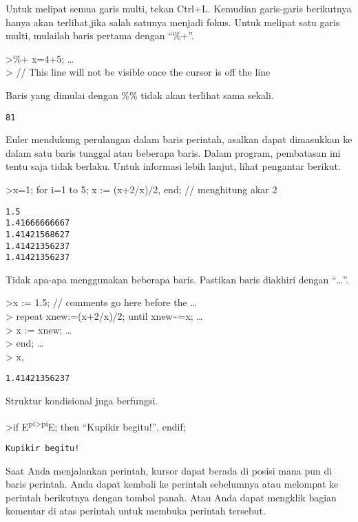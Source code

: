 \documentclass[
]{book}
\begin{document}
Untuk melipat semua garis multi, tekan Ctrl+L. Kemudian garis-garis berikutnya hanya akan terlihat,jika salah satunya menjadi fokus. Untuk melipat satu garis multi, mulailah baris pertama dengan ``\%+''.

\textgreater\%+ x=4+5; \ldots{}\\
\textgreater{} // This line will not be visible once the cursor is off the line

Baris yang dimulai dengan \%\% tidak akan terlihat sama sekali.

\begin{verbatim}
81
\end{verbatim}

Euler mendukung perulangan dalam baris perintah, asalkan dapat dimasukkan ke dalam satu baris tunggal atau beberapa baris. Dalam program, pembatasan ini tentu saja tidak berlaku. Untuk informasi lebih lanjut, lihat pengantar berikut.

\textgreater x=1; for i=1 to 5; x := (x+2/x)/2, end; // menghitung akar 2

\begin{verbatim}
1.5
1.41666666667
1.41421568627
1.41421356237
1.41421356237
\end{verbatim}

Tidak apa-apa menggunakan beberapa baris. Pastikan baris diakhiri dengan ``\ldots{}''.

\textgreater x := 1.5; // comments go here before the \ldots{}\\
\textgreater{} repeat xnew:=(x+2/x)/2; until xnew\textasciitilde=x; \ldots{}\\
\textgreater{} x := xnew; \ldots{}\\
\textgreater{} end; \ldots{}\\
\textgreater{} x,

\begin{verbatim}
1.41421356237
\end{verbatim}

Struktur kondisional juga berfungsi.

\textgreater if E\textsuperscript{pi\textgreater pi}E; then ``Kupikir begitu!'', endif;

\begin{verbatim}
Kupikir begitu!
\end{verbatim}

Saat Anda menjalankan perintah, kursor dapat berada di posisi mana pun di baris perintah. Anda dapat kembali ke perintah sebelumnya atau melompat ke perintah berikutnya dengan tombol panah. Atau Anda dapat mengklik bagian komentar di atas perintah untuk membuka perintah tersebut.
\end{document}
